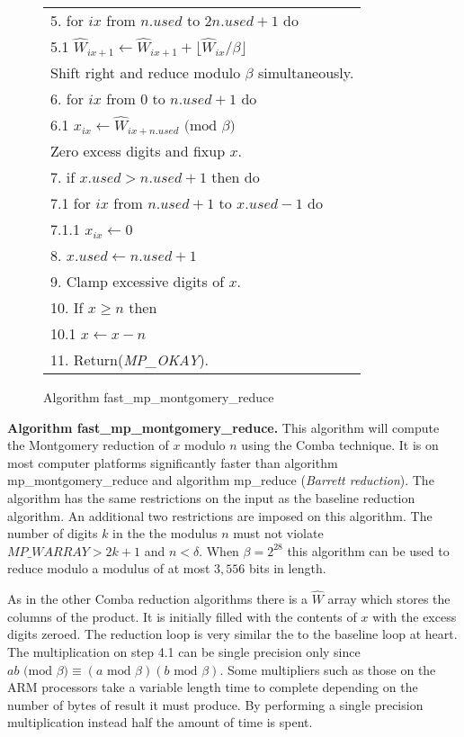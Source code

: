 \documentclass[b5paper]{book}
\begin{document}
\begin{figure}[!here]
\begin{small}
\begin{center}
\begin{tabular}{l}
5.  for $ix$ from $n.used$ to $2n.used + 1$ do \\
\hspace{3mm}5.1  $\hat W_{ix + 1} \leftarrow \hat W_{ix + 1} + \lfloor \hat W_{ix} / \beta \rfloor$ \\
Shift right and reduce modulo $\beta$ simultaneously. \\
6.  for $ix$ from $0$ to $n.used + 1$ do \\
\hspace{3mm}6.1  $x_{ix} \leftarrow \hat W_{ix + n.used} \mbox{ (mod }\beta\mbox{)}$ \\
Zero excess digits and fixup $x$. \\
7.  if $x.used > n.used + 1$ then do \\
\hspace{3mm}7.1  for $ix$ from $n.used + 1$ to $x.used - 1$ do \\
\hspace{6mm}7.1.1  $x_{ix} \leftarrow 0$ \\
8.  $x.used \leftarrow n.used + 1$ \\
9.  Clamp excessive digits of $x$. \\
10.  If $x \ge n$ then \\
\hspace{3mm}10.1  $x \leftarrow x - n$ \\
11.  Return(\textit{MP\_OKAY}). \\
\hline
\end{tabular}
\end{center}
\end{small}
\caption{Algorithm fast\_mp\_montgomery\_reduce}
\end{figure}

\textbf{Algorithm fast\_mp\_montgomery\_reduce.}
This algorithm will compute the Montgomery reduction of $x$ modulo $n$ using the Comba technique.  It is on most computer platforms significantly
faster than algorithm mp\_montgomery\_reduce and algorithm mp\_reduce (\textit{Barrett reduction}).  The algorithm has the same restrictions
on the input as the baseline reduction algorithm.  An additional two restrictions are imposed on this algorithm.  The number of digits $k$ in the 
the modulus $n$ must not violate $MP\_WARRAY > 2k +1$ and $n < \delta$.   When $\beta = 2^{28}$ this algorithm can be used to reduce modulo
a modulus of at most $3,556$ bits in length.  

As in the other Comba reduction algorithms there is a $\hat W$ array which stores the columns of the product.  It is initially filled with the
contents of $x$ with the excess digits zeroed.  The reduction loop is very similar the to the baseline loop at heart.  The multiplication on step
4.1 can be single precision only since $ab \mbox{ (mod }\beta\mbox{)} \equiv (a \mbox{ mod }\beta)(b \mbox{ mod }\beta)$.  Some multipliers such
as those on the ARM processors take a variable length time to complete depending on the number of bytes of result it must produce.  By performing
a single precision multiplication instead half the amount of time is spent.
\end{document}
